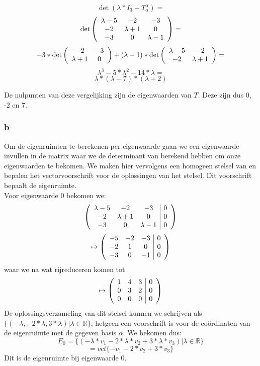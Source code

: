 \documentclass[lineaire_algebra_oplossingen.tex]{subfiles}
\begin{document}
\[\det(\lambda * I_3 - T^\alpha_\alpha)=\]
\[\det\left(
\begin{array}{c c c}
\lambda-5 & -2 & -3 \\
-2 & \lambda+1 & 0 \\
-3 & 0 & \lambda-1 \\
\end{array}
\right)=\]
\[-3*\det\left(
\begin{array}{c c}
-2 & -3 \\
\lambda+1 & 0 \\
\end{array}
\right) + (\lambda-1)*\det\left(
\begin{array}{c c}
\lambda-5 & -2 \\
-2 & \lambda+1 \\
\end{array}
\right)=\]
\[\lambda^3 - 5*\lambda^2 - 14*\lambda=\]
\[\lambda*(\lambda-7)*(\lambda+2)\]

De nulpunten van deze vergelijking zijn de eigenwaarden van $T$. Deze zijn dus 0, -2 en 7.

\subsubsection*{b}

Om de eigenruimten te berekenen per eigenwaarde gaan we een eigenwaarde invullen in de matrix waar we de determinant van berekend hebben om onze eigenwaarden te bekomen. We maken hier vervolgens een homogeen stelsel van en bepalen het vectorvoorschrift voor de oplossingen van het stelsel. Dit voorschrift bepaalt de eigenruimte.\\

Voor eigenwaarde 0 bekomen we:
\[\left(
\begin{array}{c c c | c}
\lambda-5 & -2 & -3 & 0\\
-2 & \lambda+1 & 0 & 0\\
-3 & 0 & \lambda-1 & 0\\
\end{array}
\right)\]
\[\mapsto\left(
\begin{array}{c c c | c}
-5 & -2 & -3 & 0 \\
-2 & 1 & 0 & 0\\
-3 & 0 & -1 & 0\\
\end{array}
\right)\]
waar we na wat rijreduceren komen tot
\[\mapsto\left(
\begin{array}{c c c | c}
1 & 4 & 3 & 0 \\
0 & 3 & 2 & 0\\
0 & 0 & 0 & 0\\
\end{array}
\right)\]
De oplossingsverzameling van dit stelsel kunnen we schrijven als $\{(-\lambda,-2*\lambda,3*\lambda)|\lambda\in\mathbb{R}\}$, hetgeen een voorschrift is voor de co\"ordinaten van de eigenruimte met de gegeven basis $\alpha$. We bekomen dus:
\[E_0 = \{(-\lambda*v_1-2*\lambda*v_2+3*\lambda*v_3)|\lambda\in\mathbb{R}\}\]
\[=vct\{-v_1-2*v_2+3*v_3\}\]
Dit is de eigenruimte bij eigenwaarde 0.
\end{document}
